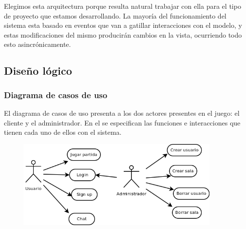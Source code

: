 \documentclass[a4paper,11pt]{article}
\begin{document}
Elegimos esta arquitectura porque resulta natural trabajar con ella 
para el tipo de proyecto que estamos desarrollando. La mayoría del 
funcionamiento del sistema esta basado en eventos que van a gatillar 
interacciones con el modelo, y estas modificaciones del mismo producirán 
cambios en la vista, ocurriendo todo esto asincrónicamente.
\newpage
\subsection{Diseño lógico}
\subsubsection{Diagrama de casos de uso}
	El diagrama de casos de uso presenta a los dos actores presentes en
el juego: el cliente y el administrador. En el se especifican las funciones e
interacciones que tienen cada uno de ellos con el sistema.
\begin{figure}[h!]
	\centering
	\includegraphics[width=0.9\textwidth]{diag_casos_uso.png}
\end{figure}
\end{document}
